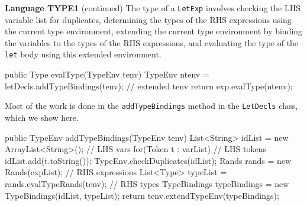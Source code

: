 \begin{minipage}[t]{\sw}
\slidenumber
\LARGE
{\bf Language TYPE1} (continued)\exx
The type of a \verb'LetExp' involves checking
the LHS variable list for duplicates,
determining the types of the RHS expressions
using the current type environment,
extending the current type environment
by binding the variables to the types of the RHS expressions,
and evaluating the type of the \verb'let' body
using this extended environment.
\Large
\begin{qv}
public Type evalType(TypeEnv tenv) {
    TypeEnv ntenv = letDecls.addTypeBindings(tenv); // extended tenv
    return exp.evalType(ntenv);
}
\end{qv}
\LARGE
Most of the work is done in the \verb'addTypeBindings' method
in the \verb'LetDecls' class,
which we show here.
\Large
\begin{qv}
public TypeEnv addTypeBindings(TypeEnv tenv) {
    List<String> idList = new ArrayList<String>(); // LHS vars
    for(Token t : varList) // LHS tokens
        idList.add(t.toString());
    TypeEnv.checkDuplicates(idList);
    Rands rands = new Rands(expList);  // RHS expressions
    List<Type> typeList = rands.evalTypeRands(tenv); // RHS types
    TypeBindings typeBindings = new TypeBindings(idList, typeList);
    return tenv.extendTypeEnv(typeBindings);
}
\end{qv}
\end{minipage}
